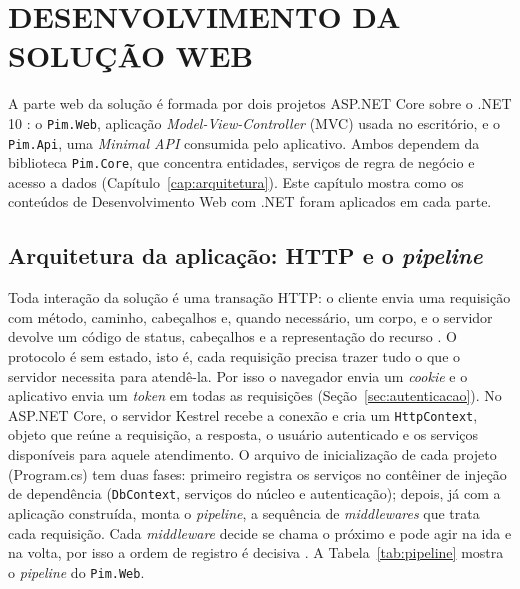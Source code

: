 \chapter{DESENVOLVIMENTO DA SOLUÇÃO WEB}
\label{cap:web}
\setlength{\emergencystretch}{3em}

A parte web da solução é formada por dois projetos ASP.NET Core sobre o .NET 10 \cite{microsoft2026aspnet}: o \texttt{Pim.Web}, aplicação \textit{Model-View-Controller} (MVC) usada no escritório, e o \texttt{Pim.Api}, uma \textit{Minimal API} consumida pelo aplicativo. Ambos dependem da biblioteca \texttt{Pim.Core}, que concentra entidades, serviços de regra de negócio e acesso a dados (Capítulo~\ref{cap:arquitetura}). Este capítulo mostra como os conteúdos de Desenvolvimento Web com .NET foram aplicados em cada parte.

\section{Arquitetura da aplicação: HTTP e o \textit{pipeline}}

Toda interação da solução é uma transação HTTP: o cliente envia uma requisição com método, caminho, cabeçalhos e, quando necessário, um corpo, e o servidor devolve um código de status, cabeçalhos e a representação do recurso \cite{ietf2022http}. O protocolo é sem estado, isto é, cada requisição precisa trazer tudo o que o servidor necessita para atendê-la. Por isso o navegador envia um \textit{cookie} e o aplicativo envia um \textit{token} em todas as requisições (Seção~\ref{sec:autenticacao}).
No ASP.NET Core, o servidor Kestrel recebe a conexão e cria um \texttt{HttpContext}, objeto que reúne a requisição, a resposta, o usuário autenticado e os serviços disponíveis para aquele atendimento. O arquivo de inicialização de cada projeto (Program.cs) tem duas fases: primeiro registra os serviços no contêiner de injeção de dependência (\texttt{DbContext}, serviços do núcleo e autenticação); depois, já com a aplicação construída, monta o \textit{pipeline}, a sequência de \textit{middlewares} que trata cada requisição. Cada \textit{middleware} decide se chama o próximo e pode agir na ida e na volta, por isso a ordem de registro é decisiva \cite{araujo2018}. A Tabela~\ref{tab:pipeline} mostra o \textit{pipeline} do \texttt{Pim.Web}.

